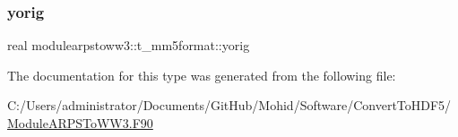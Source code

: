 \mbox{\label{structmodulearpstoww3_1_1t__mm5format_a818454401969c15e3936cc6cca9f6ee8}} 
\subsubsection{\texorpdfstring{yorig}{yorig}}
{\footnotesize\ttfamily real modulearpstoww3\+::t\+\_\+mm5format\+::yorig\hspace{0.3cm}{\ttfamily [private]}}



The documentation for this type was generated from the following file\+:\begin{DoxyCompactItemize}
\item 
C\+:/\+Users/administrator/\+Documents/\+Git\+Hub/\+Mohid/\+Software/\+Convert\+To\+H\+D\+F5/\mbox{\hyperlink{_module_a_r_p_s_to_w_w3_8_f90}{Module\+A\+R\+P\+S\+To\+W\+W3.\+F90}}\end{DoxyCompactItemize}
